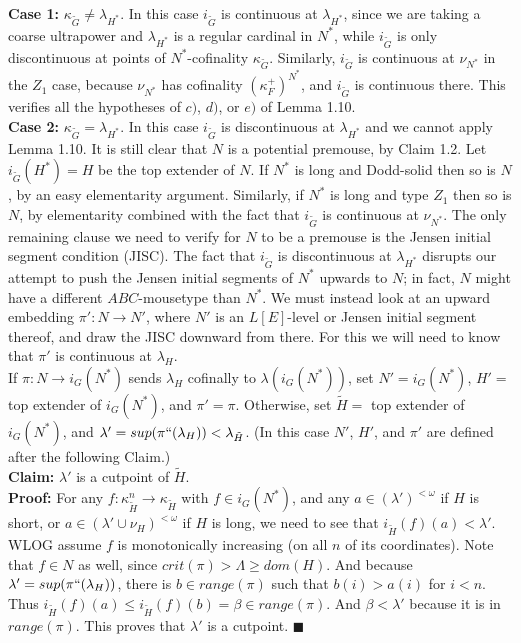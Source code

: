 \documentclass[12pt]{article}
\begin{document}
\textbf{Case 1:} $\kappa_{\tilde{G}} \neq \lambda_{H^*}$.  In this case $i_{\tilde{G}}$ is continuous at $\lambda_{H^*}$, since we are taking a coarse ultrapower and $\lambda_{H^*}$ is a regular cardinal in $N^*$, while $i_{\tilde{G}}$ is only discontinuous at points of $N^*$-cofinality $\kappa_{\tilde{G}}$.  Similarly, $i_{\tilde{G}}$ is continuous at $\nu_{N^*}$ in the $Z_1$ case, because $\nu_{N^*}$ has cofinality $(\kappa_F^+ )^{N^* }$, and $i_{\tilde{G}}$ is continuous there.  This verifies all the hypotheses of $c)$, $d)$, or $e)$ of Lemma 1.10.\\

\textbf{Case 2:} $\kappa_{\tilde{G}} = \lambda_{H^*}$.  In this case $i_{\tilde{G}}$ is discontinuous at $\lambda_{H^*}$ and we cannot apply Lemma 1.10.  It is still clear that $N$ is a potential premouse, by Claim 1.2.  Let $i_{\tilde{G}} (H^* ) = H$ be the top extender of $N$.  If $N^*$ is long and Dodd-solid then so is $N$, by an easy elementarity argument.  Similarly, if $N^*$ is long and type $Z_1$ then so is $N$, by elementarity combined with the fact that $i_{\tilde{G}}$ is continuous at $\nu_{N^* }$.  The only remaining clause we need to verify for $N$ to be a premouse is the Jensen initial segment condition (JISC).  The fact that $i_{\tilde{G}}$ is discontinuous at $\lambda_{H^*}$ disrupts our attempt to push the Jensen initial segments of $N^*$ upwards to $N$; in fact, $N$ might have a different $ABC$-mousetype than $N^*$.  We must instead look at an upward embedding $\pi': N \longrightarrow N'$, where $N'$ is an $L[E]$-level or Jensen initial segment thereof, and draw the JISC downward from there.  For this we will need to know that $\pi'$ is continuous at $\lambda_H$.\\

If $\pi : N \longrightarrow i_{G} (N^* )$ sends $\lambda_H$ cofinally to $\lambda ( i_{G} (N^* ) )$, set $N' = i_{G} (N^* )$, $H' =$ top extender of $i_{G} (N^* )$, and $\pi' = \pi$.  Otherwise, set $\tilde{H} = $ top extender of $i_{G} (N^* )$, and $\lambda' = sup (\pi`` (\lambda_H )) < \lambda_{\tilde{H}}$. (In this case $N'$, $H'$, and $\pi'$ are defined after the following Claim.)\\

\textbf{Claim:} $\lambda'$ is a cutpoint of $\tilde{H}$.\\

\textbf{Proof:}  For any $f: \kappa_{\tilde{H}}^{n} \longrightarrow \kappa_{\tilde{H}}$ with $f \in i_{G} (N^* )$, and any $a \in (\lambda' )^{< \omega }$ if $H$ is short, or $a \in (\lambda' \cup \nu_H )^{< \omega }$ if $H$ is long, we need to see that $i_{\tilde{H}} (f)(a)  < \lambda' $.  WLOG assume $f$ is monotonically increasing (on all $n$ of its coordinates).  Note that $f \in N$ as well, since $crit (\pi ) > \Lambda \geq dom (H)$.  And because $\lambda' = sup (\pi`` (\lambda_H ))$, there is $b \in range (\pi )$ such that $b(i) > a(i)$ for $i < n$.  Thus $i_{\tilde{H}} (f)(a) \leq i_{\tilde{H}} (f)(b) = \beta \in range (\pi)$.  And $\beta < \lambda'$ because it is in $range (\pi)$.  This proves that $\lambda'$ is a cutpoint. $\blacksquare$\\
\end{document}
